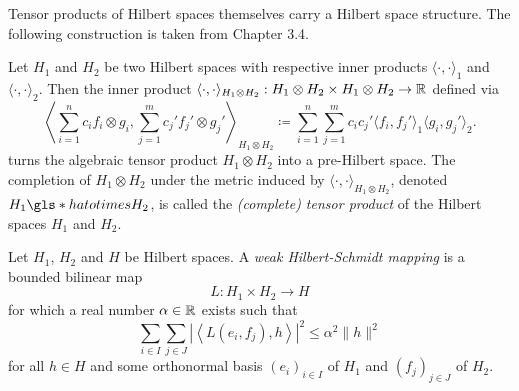 Tensor products of Hilbert spaces themselves carry a Hilbert space structure. The following construction is taken from \cite{weidmann1980linear} Chapter 3.4.
\begin{defn} \label{defn:tensor product hilbert}
    Let $H_1$ and $H_2$ be two Hilbert spaces with respective inner products $\langle \cdot, \cdot \rangle_1$ and $\langle \cdot, \cdot \rangle_2$. Then the inner product $\langle \cdot, \cdot \rangle_{H_1 \otimes H_2}: H_1 \otimes H_2 \times H_1 \otimes H_2 \to \mathbb{R}$ defined via
    \[ \left\langle \sum\limits_{i=1}^n c_i f_i \otimes g_i, \sum\limits_{j=1}^m c_j' f_j' \otimes g_j' \right\rangle_{H_1 \otimes H_2} \coloneqq \sum\limits_{i=1}^n \sum\limits_{j=1}^m c_i c_j' \langle f_i, f_j' \rangle_1 \langle g_i, g_j' \rangle_2. \]
    turns the algebraic tensor product $H_1 \otimes H_2$ into a pre-Hilbert space. The completion of $H_1 \otimes H_2$ under the metric induced by $\langle \cdot, \cdot \rangle_{H_1 \otimes H_2}$, denoted $H_1 \gls*{hatotimes} H_2$, is called the \textit{(complete) tensor product} of the Hilbert spaces $H_1$ and $H_2$.
\end{defn}

\begin{defn} \label{defn:weak Hilbert Schmidt mapping}
    Let $H_1$, $H_2$ and $H$ be Hilbert spaces. A \textit{weak Hilbert-Schmidt mapping} is a bounded bilinear map \[ L: H_1 \times H_2 \to H \] for which a real number $\alpha \in \mathbb{R}$ exists such that
    \begin{equation}
        \sum\limits_{i \in I} \sum\limits_{j \in J} \left| \left\langle L(e_i, f_j), h \right\rangle \right|^2 \leq \alpha^2 \| h \|^2
    \end{equation}
    for all $h \in H$ and some orthonormal basis $(e_i)_{i \in I}$ of $H_1$ and $(f_j)_{j \in J}$ of $H_2$.
\end{defn}

